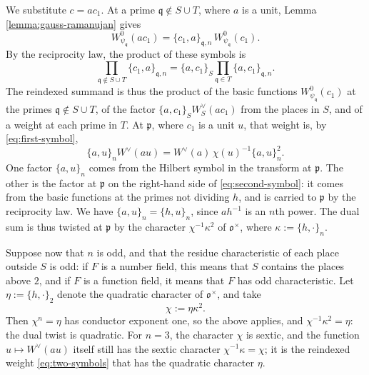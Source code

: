 \documentclass[reqno]{amsart}
\theoremstyle{plain}
\theoremstyle{definition}
\theoremstyle{itplain}
\numberwithin{equation}{section}
\numberwithin{theorem}{section}
\begin{document}
We substitute $c = a c_1$.  At a prime $\mathfrak{q} \notin S \cup T$, where $a$ is a unit, Lemma \ref{lemma:gauss-ramanujan} gives
\begin{equation*}
  W_{\psi_{\mathfrak{q}}}^0(a c_1) = \{c_1, a\}_{\mathfrak{q}, n} \, W_{\psi_{\mathfrak{q}}}^0(c_1).
\end{equation*}
By the reciprocity law, the product of these symbols is
\begin{equation}\label{eq:second-symbol}
  \prod_{\mathfrak{q} \notin S \cup T} \{c_1, a\}_{\mathfrak{q}, n}
  = \{a, c_1\}_S \prod_{\mathfrak{q} \in T} \{a, c_1\}_{\mathfrak{q}, n}.
\end{equation}
The reindexed summand is thus the product of the basic functions $W_{\psi_{\mathfrak{q}}}^0(c_1)$ at the primes $\mathfrak{q} \notin S \cup T$, of the factor $\{a, c_1\}_S W_S^\vee(a c_1)$ from the places in $S$, and of a weight at each prime in $T$.  At $\mathfrak{p}$, where $c_1$ is a unit $u$, that weight is, by \eqref{eq:first-symbol},
\begin{equation}\label{eq:two-symbols}
  \{a, u\}_n W^\vee(a u)
  = W^\vee(a) \, \chi(u)^{-1} \{a, u\}_n^2.
\end{equation}
One factor $\{a, u\}_n$ comes from the Hilbert symbol in the transform at $\mathfrak{p}$.  The other is the factor at $\mathfrak{p}$ on the right-hand side of \eqref{eq:second-symbol}: it comes from the basic functions at the primes not dividing $h$, and is carried to $\mathfrak{p}$ by the reciprocity law.  We have $\{a, u\}_n = \{h, u\}_n$, since $a h^{-1}$ is an $n$th power.  The dual sum is thus twisted at $\mathfrak{p}$ by the character $\chi^{-1} \kappa^2$ of $\mathfrak{o}^\times$, where $\kappa := \{h, \cdot\}_n$.

Suppose now that $n$ is odd, and that the residue characteristic of each place outside $S$ is odd: if $F$ is a number field, this means that $S$ contains the places above $2$, and if $F$ is a function field, it means that $F$ has odd characteristic.  Let $\eta := \{h, \cdot\}_2$ denote the quadratic character of $\mathfrak{o}^\times$, and take
\begin{equation*}
  \chi := \eta \kappa^2.
\end{equation*}
Then $\chi^n = \eta$ has conductor exponent one, so the above applies, and $\chi^{-1} \kappa^2 = \eta$: the dual twist is quadratic.  For $n = 3$, the character $\chi$ is sextic, and the function $u \mapsto W^\vee(a u)$ itself still has the sextic character $\chi^{-1} \kappa = \chi$; it is the reindexed weight \eqref{eq:two-symbols} that has the quadratic character $\eta$.
\end{document}
